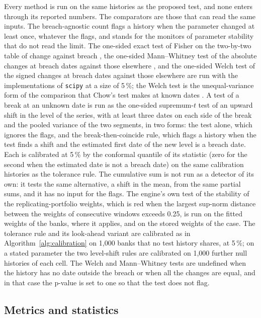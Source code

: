Every method is run on the same histories as the proposed test, and none enters through its reported numbers. The comparators are those that can read the same inputs. The breach-agnostic count flags a history when the parameter changed at least once, whatever the flags, and stands for the monitors of parameter stability that do not read the limit. The one-sided exact test of Fisher on the two-by-two table of change against breach \citep{fisher1935}, the one-sided Mann--Whitney test of the absolute changes at breach dates against those elsewhere \citep{mann1947}, and the one-sided Welch test of the signed changes at breach dates against those elsewhere \citep{welch1947} are run with the implementations of \texttt{scipy} at a size of 5\,\%; the Welch test is the unequal-variance form of the comparison that Chow's test makes at known dates \citep{chow1960}. A test of a break at an unknown date \citep{andrews1993,bai1998} is run as the one-sided supremum-$t$ test of an upward shift in the level of the series, with at least three dates on each side of the break and the pooled variance of the two segments, in two forms: the test alone, which ignores the flags, and the break-then-coincide rule, which flags a history when the test finds a shift and the estimated first date of the new level is a breach date. Each is calibrated at 5\,\% by the conformal quantile of its statistic (zero for the second when the estimated date is not a breach date) on the same calibration histories as the tolerance rule. The cumulative sum \citep{page1954,brown1975} is not run as a detector of its own: it tests the same alternative, a shift in the mean, from the same partial sums, and it has no input for the flags. The engine's own test of the stability of the replicating-portfolio weights, which is red when the largest sup-norm distance between the weights of consecutive windows exceeds 0.25, is run on the fitted weights of the banks, where it applies, and on the stored weights of the case. The tolerance rule and its look-ahead variant are calibrated as in Algorithm~\ref{alg:calibration} on 1,000 banks that no test history shares, at 5\,\%; on a stated parameter the two level-shift rules are calibrated on 1,000 further null histories of each cell. The Welch and Mann--Whitney tests are undefined when the history has no date outside the breach or when all the changes are equal, and in that case the p-value is set to one so that the test does not flag.

\subsection{Metrics and statistics}
\label{sec:design-metrics}

